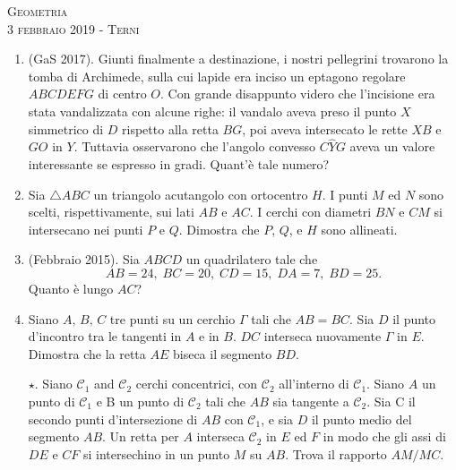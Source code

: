 \documentclass[a4paper]{article}
\theoremstyle{remark}
\theoremstyle{definition}
\begin{document}
\newpage
\begin{center}
	\vspace*{0,5 cm}
	{\Huge \textsc{Geometria}} \\
	\vspace{0,5 cm}
	\textsc{3 febbraio 2019 - Terni}
	\thispagestyle{empty}
	\vspace{0,7 cm}
\end{center}
\normalsize

\begin{enumerate}
	
	\item  (GaS 2017). Giunti finalmente a destinazione, i nostri pellegrini trovarono la tomba di Archimede, sulla cui lapide era inciso un eptagono
	regolare $ ABCDEFG $ di centro $ O $. Con grande disappunto videro che l’incisione era stata vandalizzata con alcune righe:
	il vandalo aveva preso il punto $ X $ simmetrico di $ D $ rispetto alla retta $ BG $, poi aveva intersecato le rette $ XB  $ e $ GO $ in $ Y $.
	Tuttavia osservarono che l’angolo convesso $ C\hat{Y}G $ aveva un valore interessante se espresso in gradi. Quant’è tale numero?
	
	\item Sia $ \bigtriangleup ABC $ un triangolo acutangolo con ortocentro $ H $. I punti $ M $ ed $ N $ sono scelti, rispettivamente, sui lati $ AB $ e $ AC $. I cerchi con diametri $ BN $ e $ CM $ si intersecano nei punti $ P $ e $ Q $. Dimostra che $ P $, $ Q $, e $ H $ sono allineati. \\
	
	\item (Febbraio 2015).  Sia $ ABCD $ un quadrilatero tale che $$  AB = 24 ,\; BC = 20 ,\; CD = 15 ,\; DA = 7 ,\; BD = 25 . $$ Quanto è lungo $ AC $? 
	
	\item Siano $ A,\, B,\, C $ tre punti su un cerchio $ \Gamma $ tali che $ AB = BC $. Sia $ D $ il punto d'incontro tra le tangenti in $ A $ e in $ B $. $ DC $ interseca nuovamente $ \Gamma $ in $ E $. Dimostra che la retta $ AE $ biseca il segmento $ BD $. \\
	
	\item[$ \star. $] Siano $ \mathcal{C}_1 $ and $ \mathcal{C}_2 $ cerchi concentrici, con $ \mathcal{C}_2 $ all'interno di $ \mathcal{C}_1 $. Siano $ A $ un punto di $ \mathcal{C}_1 $ e B un punto di $ \mathcal{C}_2 $ tali che $ AB $ sia tangente a $ \mathcal{C}_2 $. Sia C il secondo punti d'intersezione di $ AB $ con $ \mathcal{C}_1 $, e sia $ D $ il punto medio del segmento $ AB $. Un retta per $ A $ interseca $ \mathcal{C}_2 $ in $ E $ ed $ F $ in modo che gli assi di $ DE $
	e $ CF $ si intersechino in un punto $ M $ su $ AB $. Trova il rapporto $ AM/MC $. \\
	
	
\end{enumerate}
\end{document}
